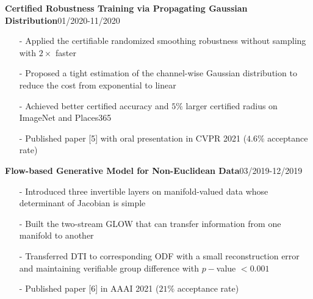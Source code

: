 \documentclass[margin]{res}
\begin{document}
\begin{resume}
                 \vspace{-1em} 
                \textbf{Certified Robustness Training via Propagating Gaussian Distribution}\hfill 01/2020-11/2020
                \begin{itemize}\itemsep -2.2pt %
                 \item[-] Applied the certifiable randomized smoothing robustness without sampling with $2\times$ faster
                 \item[-] Proposed a tight estimation of the channel-wise Gaussian distribution to reduce the cost from exponential to linear
                 \item[-] Achieved better certified accuracy and $5\%$ larger certified radius on ImageNet and Places365
                 \item[-] Published paper [5] with oral presentation in CVPR 2021 ($4.6\%$ acceptance rate)
                 \end{itemize}

                 \vspace{-1em}  

                \textbf{Flow-based Generative Model for Non-Euclidean Data}\hfill 03/2019-12/2019
                \begin{itemize}\itemsep -2.2pt %
                 \item[-] Introduced three invertible layers on manifold-valued data whose determinant of Jacobian is simple
                 \item[-] Built the two-stream GLOW that can transfer information from one manifold to another
                 \item[-] Transferred DTI to corresponding ODF with a small reconstruction error and maintaining verifiable group difference with $p-$value $<0.001$
				\item[-] Published paper [6] in AAAI 2021 ($21\%$ acceptance rate)
                 \end{itemize}

                 \vspace{-1em}  


\end{resume}
\end{document}
